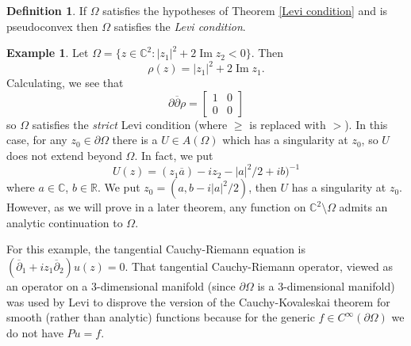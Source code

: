 \documentclass[12pt]{report}
\newcommand{\RR}{\mathbb{R}}
\newcommand{\CC}{\mathbb{C}}
\newcommand{\dbar}{\overline\partial}
\renewcommand{\Im}{\operatorname{Im}}
\newcommand{\dfn}[1]{\emph{#1}\index{#1}}
\theoremstyle{definition}
\newtheorem{definition}[theorem]{Definition}
\newtheorem{example}[theorem]{Example}
\begin{document}
\begin{definition}
    If $\Omega$ satisfies the hypotheses of Theorem \ref{Levi condition} and is pseudoconvex then $\Omega$ satisfies the \dfn{Levi condition}.
\end{definition}
\begin{example}
    Let $\Omega = \{z \in \CC^2: |z_1|^2 + 2 \Im z_2 < 0\}$. Then
    $$\rho(z) = |z_1|^2 + 2 \Im z_1.$$
    Calculating, we see that $$\partial\dbar \rho = \begin{bmatrix}1&0\\0&0\end{bmatrix}$$
    so $\Omega$ satisfies the \emph{strict} Levi condition (where $\geq$ is replaced with $>$). In this case, for any $z_0 \in \partial \Omega$ there is a $U \in A(\Omega)$ which has a singularity at $z_0$, so $U$ does not extend beyond $\Omega$. In fact, we put
    $$U(z) = (z_1\overline a) - iz_2 - |a|^2/2 + ib)^{-1}$$
    where $a \in \CC$, $b \in \RR$. We put $z_0 = (a, b -i|a|^2/2)$, then $U$ has a singularity at $z_0$. However, as we will prove in a later theorem, any function on $\CC^2 \setminus \Omega$ admits an analytic continuation to $\Omega$.

    For this example, the tangential Cauchy-Riemann equation is $(\dbar_1 + iz_1\dbar_2)u(z) = 0$. That tangential Cauchy-Riemann operator, viewed as an operator on a $3$-dimensional manifold (since $\partial \Omega$ is a $3$-dimensional manifold) was used by Levi to disprove the version of the Cauchy-Kovaleskai theorem for smooth (rather than analytic) functions because for the generic $f \in C^\infty(\partial \Omega)$ we do not have $Pu = f$.
\end{example}
\end{document}
